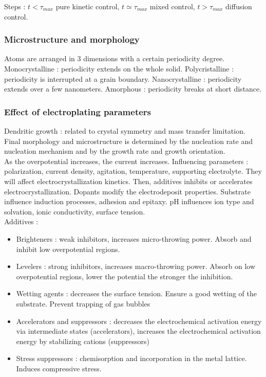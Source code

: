 \documentclass[../main.tex]{subfiles}
\begin{document}
Steps : $t<\tau_{max}$ pure kinetic control, $t \simeq \tau_{max}$ mixed control, $t>\tau_{max}$ diffusion control.\\

\subsubsection{Microstructure and morphology}
Atoms are arranged in 3 dimensions with a certain periodicity degree. Monocrystalline : periodicity extends on the whole solid. Polycristalline : periodicity is interrupted at a grain boundary. Nanocrystalline : periodicity extends over a few nanometers. Amorphous : periodicity breaks at short distance.

\subsubsection{Effect of electroplating parameters}
Dendritic growth : related to crystal symmetry and mass transfer limitation. Final morphology and microstructure is determined by the nucleation rate and nucleation mechanism and by the growth rate and growth orientation.\\
As the overpotential increases, the current increases. Influencing parameters : polarization, current density, agitation, temperature, supporting electrolyte. They will affect electrocrystallization kinetics. Then, additives inhibits or accelerates electrocrystallization. Dopants modify the electrodeposit properties. Substrate influence induction processes, adhesion and epitaxy. pH influences ion type and solvation, ionic conductivity, surface tension.\\

Additives : \begin{itemize}
    \item Brighteners : weak inhibitors, increases micro-throwing power. Absorb and inhibit low overpotential regions.
    \item Levelers : strong inhibitors, increases macro-throwing power. Absorb on low overpotential regions, lower the potential the stronger the inhibition.
    \item Wetting agents : decreases the surface tension. Ensure a good wetting of the substrate. Prevent trapping of gas bubbles
    \item Accelerators and suppressors : decreases the electrochemical activation energy via intermediate states (accelerators), increases the electrochemical activation energy by stabilizing cations (suppressors)
    \item Stress suppressors : chemisorption and incorporation in the metal lattice. Induces compressive stress.
\end{itemize}
\end{document}
